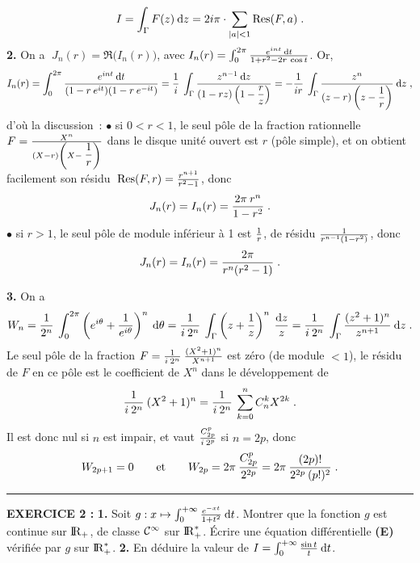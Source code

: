 \documentclass{article}
\begin{document}
$$I=\int_{\Gamma}F(z)\>{\rm d}z=2i\pi\cdot\sum_{|a|<1}{\rm Res}(F,a)\;.$$
\ssk
{\bf 2.} On a $\;J_n(r)=\Re\big(I_n(r)\big)$, avec $I_n(r)=\int_0^{2\pi}{e^{int}\>{\rm d}t\over1+r^2-2r\>\cos t}$. Or,\vv
$$I_n(r)=\int_0^{2\pi}{e^{int}\>{\rm d}t\over(1-r\>e^{it})(1-r\>e^{-it})}={1\over i}\>\int_{\Gamma}{z^{n-1}\>{\rm d}z\over(1-rz)\left(1-\displaystyle{r\over z}\right)}=-{1\over ir}\>\int_{\Gamma}{z^n\over(z-r)\left( z-\displaystyle{1\over r}\right)}\>{\rm d}z\;,$$
d'o\`u la discussion~:\ssk\new
$\bullet$ si $0<r<1$, le seul p\^ole de la fraction rationnelle $F={X^n\over(X-r)\left( X-\displaystyle{1\over r}\right)}$ dans le disque unit\'e ouvert est $r$ (p\^ole simple), et on obtient facilement son r\'esidu $\;{\rm Res}(F,r)={r^{n+1}\over r^2-1}$, donc\vv
$$J_n(r)=I_n(r)={2\pi\>r^n\over 1-r^2}\;.$$
$\bullet$ si $r>1$, le seul p\^ole de module inf\'erieur \`a 1 est ${1\over r}$, de r\'esidu ${1\over r^{n-1}(1-r^2)}$, donc
$$J_n(r)=I_n(r)={2\pi\over r^n(r^2-1)}\;.$$

\ssk
{\bf 3.} On a\vv
$$W_n={1\over2^n}\>\int_0^{2\pi}\left( e^{i\theta}+{1\over e^{i\theta}}\right)^n\>{\rm d}\theta={1\over i\>2^n}\>\int_{\Gamma}\left( z+{1\over z}\right)^n\>{{\rm d}z\over z}={1\over i\>2^n}\>\int_{\Gamma}{(z^2+1)^n\over z^{n+1}}\>{\rm d}z\;.$$
Le seul p\^ole de la fraction $F={1\over i\>2^n}\>{(X^2+1)^n\over X^{n+1}}$ est z\'ero (de module $<1$), le r\'esidu de $F$ en ce p\^ole est le coefficient de $X^n$ dans le d\'eveloppement de\vv
$${1\over i\>2^n}\>(X^2+1)^n={1\over i\>2^n}\>\sum_{k=0}^nC_n^kX^{2k}\;.$$
Il est donc nul si $n$ est impair, et vaut ${C_{2p}^p\over i\>2^p}$ si $n=2p$, donc
$$W_{2p+1}=0\qquad{\rm et}\qquad W_{2p}=2\pi\>{C_{2p}^p\over2^{2p}}=2\pi\>{(2p)!\over2^{2p}\>(p!)^2}\;.$$


\hrule
\eject

{\bf EXERCICE 2 :}\msk
{\bf 1.} Soit $g:x\mapsto\int_0^{+\infty}{e^{-xt}\over1+t^2}\>{\rm d}t$.\msk\sect
Montrer que la fonction $g$ est continue sur ${\rm I\kern-0.6mm R}_+$, de classe ${\cal C}^{\infty}$ sur ${\rm I\kern-0.6mm R}_+^*$. \'Ecrire une \'equation diff\'erentielle {\bf (E)} v\'erifi\'ee par $g$ sur ${\rm I\kern-0.6mm R}_+^*$.\msk
{\bf 2.} En d\'eduire la valeur de $I=\int_0^{+\infty}{\sin t\over t}\>{\rm d}t$.


\msk
\cl{- - - - - - - - - - - - - - - - - - - - - - - - - - - - - -}
\msk
\end{document}
